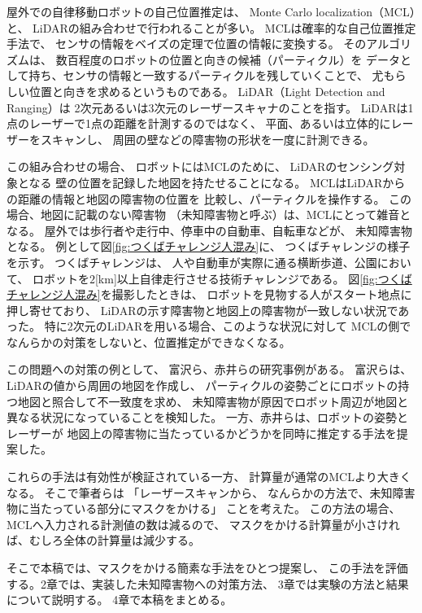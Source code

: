 \documentclass{jarticle}
\begin{document}
屋外での自律移動ロボットの自己位置推定は、
Monte Carlo localization（MCL）\cite{gutmann2002}と、
LiDARの組み合わせで行われることが多い。
MCLは確率的な自己位置推定手法で、
センサの情報をベイズの定理で位置の情報に変換する。
そのアルゴリズムは、
数百程度のロボットの位置と向きの候補（パーティクル）を
データとして持ち、センサの情報と一致するパーティクルを残していくことで、
尤もらしい位置と向きを求めるというものである。
LiDAR（Light Detection and Ranging）は
2次元あるいは3次元のレーザースキャナのことを指す。
LiDARは1点のレーザーで1点の距離を計測するのではなく、
平面、あるいは立体的にレーザーをスキャンし、
周囲の壁などの障害物の形状を一度に計測できる。


この組み合わせの場合、
ロボットにはMCLのために、
LiDARのセンシング対象となる
壁の位置を記録した地図を持たせることになる。
MCLはLiDARからの距離の情報と地図の障害物の位置を
比較し、パーティクルを操作する。
この場合、地図に記載のない障害物
（未知障害物と呼ぶ）は、MCLにとって雑音となる。
屋外では歩行者や走行中、停車中の自動車、自転車などが、
未知障害物となる。
例として図\ref{fig:つくばチャレンジ人混み}に、
つくばチャレンジ\cite{つくばチャレンジ}の様子を示す。
つくばチャレンジは、
人や自動車が実際に通る横断歩道、公園において、
ロボットを$2$[km]以上自律走行させる技術チャレンジである。
図\ref{fig:つくばチャレンジ人混み}を撮影したときは、
ロボットを見物する人がスタート地点に押し寄せており、
LiDARの示す障害物と地図上の障害物が一致しない状況であった。
特に2次元のLiDARを用いる場合、このような状況に対して
MCLの側でなんらかの対策をしないと、位置推定ができなくなる。

この問題への対策の例として、
富沢ら\cite{富沢2012}、赤井ら\cite{赤井2019}の研究事例がある。
富沢らは、LiDARの値から周囲の地図を作成し、
パーティクルの姿勢ごとにロボットの持つ地図と照合して不一致度を求め、
未知障害物が原因でロボット周辺が地図と異なる状況になっていることを検知した。
一方、赤井らは、ロボットの姿勢とレーザーが
地図上の障害物に当たっているかどうかを同時に推定する手法を提案した。


これらの手法は有効性が検証されている一方、
計算量が通常のMCLより大きくなる。
そこで筆者らは
「レーザースキャンから、
なんらかの方法で、未知障害物に当たっている部分にマスクをかける」
ことを考えた。
この方法の場合、MCLへ入力される計測値の数は減るので、
マスクをかける計算量が小さければ、むしろ全体の計算量は減少する。

そこで本稿では、マスクをかける簡素な手法をひとつ提案し、
この手法を評価する。2章では、実装した未知障害物への対策方法、
3章では実験の方法と結果について説明する。
4章で本稿をまとめる。
\end{document}
